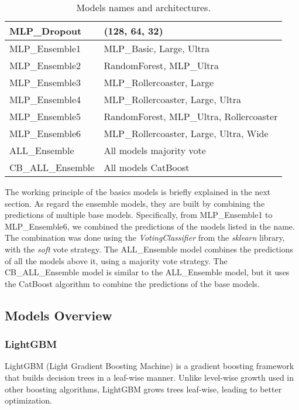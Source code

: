 \begin{table}[h!]
\begin{tabular}{|l|l|}
        MLP\_Dropout            & (128, 64, 32)                                         \\ \hline
        MLP\_Ensemble1          & MLP\_Basic, Large, Ultra                    \\ \hline
        MLP\_Ensemble2          & RandomForest, MLP\_Ultra                              \\ \hline
        MLP\_Ensemble3          & MLP\_Rollercoaster, Large                        \\ \hline
        MLP\_Ensemble4          & MLP\_Rollercoaster, Large, Ultra            \\ \hline
        MLP\_Ensemble5          & RandomForest, MLP\_Ultra, Rollercoaster          \\ \hline
        MLP\_Ensemble6          & MLP\_Rollercoaster, Large, Ultra, Wide \\ \hline
        ALL\_Ensemble           & All models majority vote                              \\ \hline
        CB\_ALL\_Ensemble       & All models CatBoost                                   \\ \hline
    \end{tabular}
    \caption{Models names and architectures.}
    \label{tab:models}
\end{table}

\noindent
The working principle of the basics models is briefly explained in the next section. As regard the ensemble models,
they are built by combining the predictions of multiple base models. Specifically, from MLP\_Ensemble1 to MLP\_Ensemble6,
we combined the predictions of the models listed in the name. The combination was done using the \textit{VotingClassifier}
from the \textit{sklearn} library, with the \textit{soft} vote strategy. 
The ALL\_Ensemble model combines the predictions of all the models above it, using a majority vote strategy. The CB\_ALL\_Ensemble model is similar to the ALL\_Ensemble model, but
it uses the CatBoost algorithm to combine the predictions of the base models.


\subsection{Models Overview}

\subsubsection{LightGBM}
LightGBM (Light Gradient Boosting Machine) is a gradient boosting framework that builds decision trees in a leaf-wise manner. Unlike level-wise growth used in other boosting algorithms, LightGBM grows trees leaf-wise, leading to better optimization.

